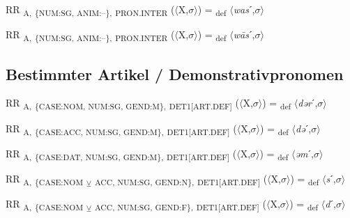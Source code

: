 {\begin{exe}
 RR \textsubscript{A,} \textsubscript{\{NUM:SG, ANIM:–\},} \textsubscript{PRON.INTER} ($\langle$X,$\sigma $$\rangle$) = \textsubscript{def} $\langle$\textit{was}ˊ,$\sigma $$\rangle$
\end{exe}

\begin{exe}
 RR \textsubscript{A,} \textsubscript{\{NUM:SG, ANIM:–\},} \textsubscript{PRON.INTER} ($\langle$X,$\sigma $$\rangle$) = \textsubscript{def} $\langle$\textit{w\=as}ˊ,$\sigma $$\rangle$
\end{exe}

\subsection{Bestimmter Artikel / Demonstrativpronomen}

\begin{exe}
 RR \textsubscript{A,} \textsubscript{\{CASE:NOM, NUM:SG, GEND:M\},} \textsubscript{DET1[ART.DEF]} ($\langle$X,$\sigma $$\rangle$) = \textsubscript{def} $\langle$\textit{dər}ˊ,$\sigma $$\rangle$
\end{exe}

\begin{exe}
 RR \textsubscript{A,} \textsubscript{\{CASE:ACC, NUM:SG, GEND:M\},} \textsubscript{DET1[ART.DEF]} ($\langle$X,$\sigma $$\rangle$) = \textsubscript{def} $\langle$\textit{də}ˊ,$\sigma $$\rangle$
\end{exe}

\begin{exe}
 RR \textsubscript{A,} \textsubscript{\{CASE:DAT, NUM:SG, GEND:M\},} \textsubscript{DET1[ART.DEF]} ($\langle$X,$\sigma $$\rangle$) = \textsubscript{def} $\langle$\textit{əm}ˊ,$\sigma $$\rangle$
\end{exe}

\begin{exe}
 RR \textsubscript{A,} \textsubscript{\{CASE:NOM} \textsubscript{${\veebar}$}\textsubscript{ ACC, NUM:SG, GEND:N\},} \textsubscript{DET1[ART.DEF]} ($\langle$X,$\sigma $$\rangle$) = \textsubscript{def} $\langle$\textit{s}ˊ,$\sigma $$\rangle$
\end{exe}

\begin{exe}
 RR \textsubscript{A,} \textsubscript{\{CASE:NOM} \textsubscript{${\veebar}$}\textsubscript{ ACC, NUM:SG, GEND:F\},} \textsubscript{DET1[ART.DEF]} ($\langle$X,$\sigma $$\rangle$) = \textsubscript{def} $\langle$\textit{d}ˊ,$\sigma $$\rangle$
\end{exe}

}
